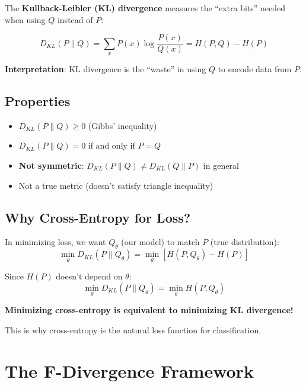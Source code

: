 The \textbf{Kullback-Leibler (KL) divergence} measures the ``extra bits'' needed when using $Q$ instead of $P$:

\begin{definition}[KL Divergence]
\[
\boxed{D_{KL}(P \| Q) = \sum_{x} P(x) \log \frac{P(x)}{Q(x)} = H(P, Q) - H(P)}
\]
\end{definition}

\textbf{Interpretation}: KL divergence is the ``waste'' in using $Q$ to encode data from $P$.

\subsection{Properties}

\begin{itemize}
    \item $D_{KL}(P \| Q) \geq 0$ (Gibbs' inequality)
    \item $D_{KL}(P \| Q) = 0$ if and only if $P = Q$
    \item \textbf{Not symmetric}: $D_{KL}(P \| Q) \neq D_{KL}(Q \| P)$ in general
    \item Not a true metric (doesn't satisfy triangle inequality)
\end{itemize}

\subsection{Why Cross-Entropy for Loss?}

In minimizing loss, we want $Q_{\theta}$ (our model) to match $P$ (true distribution):
\[
\min_\theta D_{KL}(P \| Q_\theta) = \min_\theta \left[ H(P, Q_\theta) - H(P) \right]
\]

Since $H(P)$ doesn't depend on $\theta$:
\[
\min_\theta D_{KL}(P \| Q_\theta) = \min_\theta H(P, Q_\theta)
\]

\begin{important}
\textbf{Minimizing cross-entropy is equivalent to minimizing KL divergence!}

This is why cross-entropy is the natural loss function for classification.
\end{important}

\section{The F-Divergence Framework}

